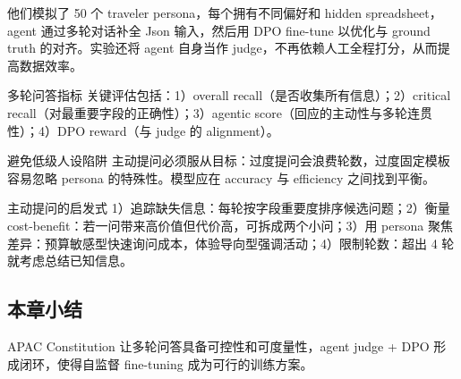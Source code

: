 他们模拟了 50 个 traveler persona，每个拥有不同偏好和 hidden spreadsheet，agent 通过多轮对话补全 Json 输入，然后用 DPO fine-tune 以优化与 ground truth 的对齐。实验还将 agent 自身当作 judge，不再依赖人工全程打分，从而提高数据效率。
\begin{knowledgebox}{多轮问答指标}
关键评估包括：1）overall recall（是否收集所有信息）；2）critical recall（对最重要字段的正确性）；3）agentic score（回应的主动性与多轮连贯性）；4）DPO reward（与 judge 的 alignment）。
\end{knowledgebox}
\begin{warningbox}{避免低级人设陷阱}
主动提问必须服从目标：过度提问会浪费轮数，过度固定模板容易忽略 persona 的特殊性。模型应在 accuracy 与 efficiency 之间找到平衡。
\end{warningbox}
\begin{knowledgebox}{主动提问的启发式}
1）追踪缺失信息：每轮按字段重要度排序候选问题；2）衡量 cost-benefit：若一问带来高价值但代价高，可拆成两个小问；3）用 persona 聚焦差异：预算敏感型快速询问成本，体验导向型强调活动；4）限制轮数：超出 4 轮就考虑总结已知信息。
\end{knowledgebox}

\subsection{本章小结}

APAC Constitution 让多轮问答具备可控性和可度量性，agent judge + DPO 形成闭环，使得自监督 fine-tuning 成为可行的训练方案。

